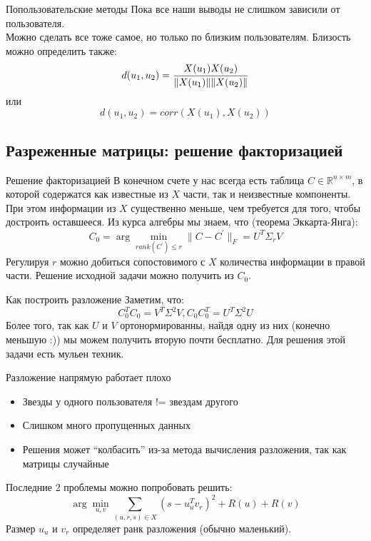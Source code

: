 \documentclass[14pt, fleqn, xcolor={dvipsnames, table}]{beamer}
\begin{document}
\begin{frame}{Попользовательские методы}
Пока все наши выводы не слишком зависили от пользователя. \\
Можно сделать все тоже самое, но только по близким пользователям. Близость можно определить также:
$$
d(u_1, u_2) = {X(u_1) X(u_2) \over \|X(u_1)\| \|X(u_2)\|}
$$
или 
$$
d(u_1, u_2) = corr(X(u_1), X(u_2))
$$
\end{frame}

\subsection{Разреженные матрицы: решение факторизацией} %
\begin{frame}{Решение факторизацией}
\small
В конечном счете у нас всегда есть таблица $C \in \mathbb{R}^{n \times m}$, в которой содержатся как известные из $X$ части, так и неизвестные компоненты. При этом информации из $X$ существенно меньше, чем требуется для того, чтобы достроить оставшееся. Из курса алгебры мы знаем, что (теорема Эккарта-Янга):
$$
C_0 = \arg \min_{rank(C^{'}) \le r} \|C - C^{'}\|_F = U^T \Sigma_r V
$$
Регулируя $r$ можно добиться сопостовимого с $X$ количества информации в правой части. Решение исходной задачи можно получить из $C_0$.
\end{frame}

\begin{frame}{Как построить разложение}
Заметим, что:
$$
C_0^T C_0 = V^T \Sigma^2 V, C_0 C_0^T = U^T \Sigma^2 U
$$
Более того, так как $U$ и $V$ ортонормированны, найдя одну из них (конечно меньшую :)) мы можем получить вторую почти бесплатно. Для решения этой задачи есть мульен техник.
\end{frame}

\begin{frame}{Разложение напрямую работает плохо}
\begin{itemize}
  \item Звезды у одного пользователя != звездам другого
  \item Слишком много пропущенных данных
  \item Решения может ``колбасить'' из-за метода вычисления разложения, так как матрицы случайные
\end{itemize}
Последние 2 проблемы можно попробовать решить:
$$
\arg \min_{u,v} \sum_{(u,r,s) \in X} (s - u_u^T v_r)^2 + R(u) + R(v)
$$
Размер $u_u$ и $v_r$ определяет ранк разложения (обычно маленький).
\end{frame}
\end{document}
